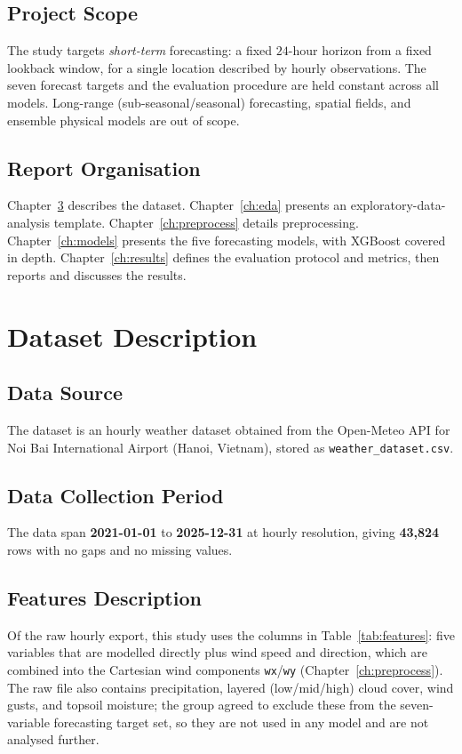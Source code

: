 \documentclass[12pt,a4paper,oneside]{report}
\begin{document}
\section{Project Scope}
The study targets \emph{short-term} forecasting: a fixed $24$-hour horizon from a
fixed lookback window, for a single location described by hourly observations.
The seven forecast targets and the evaluation procedure are held constant across
all models. Long-range (sub-seasonal/seasonal) forecasting, spatial fields, and
ensemble physical models are out of scope.

\section{Report Organisation}
Chapter~\ref{ch:dataset} describes the dataset. Chapter~\ref{ch:eda} presents an
exploratory-data-analysis template. Chapter~\ref{ch:preprocess} details
preprocessing. Chapter~\ref{ch:models} presents the five forecasting models, with
XGBoost covered in depth. Chapter~\ref{ch:results} defines the evaluation
protocol and metrics, then reports and discusses the results.

\chapter{Dataset Description}
\label{ch:dataset}

\section{Data Source}
The dataset is an hourly weather dataset obtained from the Open-Meteo API
\citep{openmeteo} for Noi Bai International Airport (Hanoi, Vietnam), stored as \texttt{weather\_dataset.csv}. %

\section{Data Collection Period}
The data span \textbf{2021-01-01} to \textbf{2025-12-31} at hourly resolution,
giving \textbf{43{,}824} rows with no gaps and no missing values.

\section{Features Description}
Of the raw hourly export, this study uses the columns in Table~\ref{tab:features}:
five variables that are modelled directly plus wind speed and direction, which are
combined into the Cartesian wind components \texttt{wx}/\texttt{wy}
(Chapter~\ref{ch:preprocess}). The raw file also contains precipitation, layered
(low/mid/high) cloud cover, wind gusts, and topsoil moisture; the group agreed to
exclude these from the seven-variable forecasting target set, so they are not used
in any model and are not analysed further.
\end{document}
